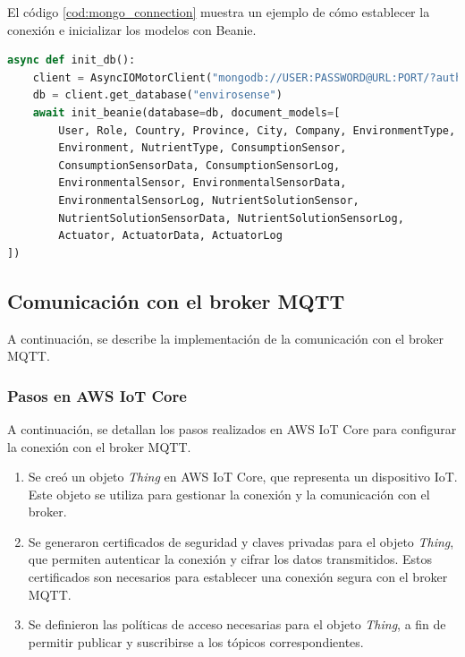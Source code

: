 El código \ref{cod:mongo_connection} muestra un ejemplo de cómo establecer la
conexión e inicializar los modelos con Beanie.

\begin{lstlisting}[label=cod:mongo_connection,caption=Ejemplo de conexión a MongoDB, language=Python]
async def init_db():
    client = AsyncIOMotorClient("mongodb://USER:PASSWORD@URL:PORT/?authSource=admin")
    db = client.get_database("envirosense")
    await init_beanie(database=db, document_models=[
        User, Role, Country, Province, City, Company, EnvironmentType, 
        Environment, NutrientType, ConsumptionSensor, 
        ConsumptionSensorData, ConsumptionSensorLog, 
        EnvironmentalSensor, EnvironmentalSensorData, 
        EnvironmentalSensorLog, NutrientSolutionSensor, 
        NutrientSolutionSensorData, NutrientSolutionSensorLog, 
        Actuator, ActuatorData, ActuatorLog
])
\end{lstlisting}

\subsection{Comunicación con el broker MQTT}

A continuación, se describe la implementación de la comunicación con el broker
MQTT.


\subsubsection{Pasos en AWS IoT Core}

A continuación, se detallan los pasos realizados en AWS IoT Core para
configurar la conexión con el broker MQTT.

\begin{enumerate}
    \item Se creó un objeto \textit{Thing} en AWS IoT Core, que representa un dispositivo
          IoT. Este objeto se utiliza para gestionar la conexión y la comunicación con el
          broker.
    \item Se generaron certificados de seguridad y claves privadas para el objeto
          \textit{Thing}, que permiten autenticar la conexión y cifrar los datos
          transmitidos. Estos certificados son necesarios para establecer una conexión
          segura con el broker MQTT.
    \item Se definieron las políticas de acceso necesarias para el objeto \textit{Thing},
          a fin de permitir publicar y suscribirse a los tópicos correspondientes.
\end{enumerate}

